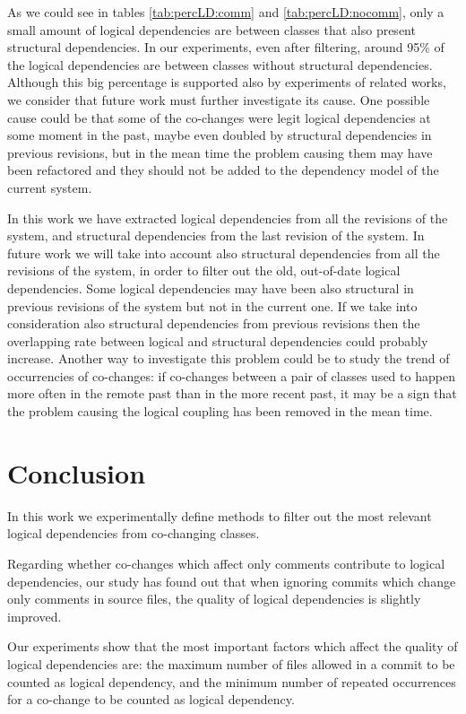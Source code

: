 \documentclass[a4paper,twoside]{article}
\begin{document}
As we could see in tables \ref{tab:percLD:comm} and \ref{tab:percLD:nocomm}, only a small amount of logical dependencies are between classes that also present structural dependencies.  In our experiments, even after filtering, around 95\% of the logical dependencies are between classes without structural dependencies. Although this big percentage is supported also by experiments of related works, we consider that future work must further investigate its cause. One possible cause could be that some of the co-changes were legit logical dependencies at some moment in the past, maybe even doubled by structural dependencies in previous revisions, but in the mean time the problem causing them may have been refactored and they should not be added to the dependency model of the current system.  

In this work we have extracted logical dependencies from all the revisions of the system, and structural dependencies from the last revision of the system. In future work we will take into account also structural dependencies from all the revisions of the system, in order to filter out the old, out-of-date logical dependencies.  Some logical dependencies may have been also structural in previous revisions of the system but not in the current one. If we take into consideration also structural dependencies from previous revisions then the overlapping rate between logical and structural dependencies could probably increase. Another way to investigate this problem could be to study the trend of occurrencies of co-changes: if co-changes between a pair of classes used to happen more often in the remote past than in the more recent past, it may be a sign that the problem causing the logical coupling has been removed in the mean time. 


   


\section{Conclusion}
\label{sec:Conclusion}
   
In this work we experimentally define methods to filter out the most relevant logical dependencies from co-changing classes. 

Regarding whether co-changes which affect only comments contribute to logical dependencies, our study has found out that when ignoring commits which change only comments in source files, the quality of logical dependencies is slightly improved.

Our experiments show that the most important factors which affect the quality of logical dependencies are: the maximum number of files allowed in a commit to be counted as logical dependency, and the minimum number of repeated occurrences for a co-change to be counted as logical dependency. 


 

{\small
}
 
\end{document}
